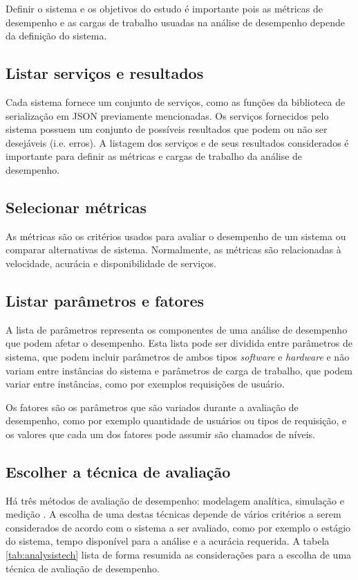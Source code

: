Definir o sistema e os objetivos do estudo é importante pois as métricas de desempenho e as cargas de trabalho usuadas na análise de desempenho depende da definição do sistema.

\subsection{Listar serviços e resultados}

Cada sistema fornece um conjunto de serviços, como as funções da biblioteca de serialização em JSON previamente mencionadas. Os serviços fornecidos pelo sistema possuem um conjunto de possíveis resultados que podem ou não ser desejáveis (i.e. erros). A listagem dos serviços e de seus resultados considerados é importante para definir as métricas e cargas de trabalho da análise de desempenho.

\subsection{Selecionar métricas}

As métricas são os critérios usados para avaliar o desempenho de um sistema ou comparar alternativas de sistema. Normalmente, as métricas são relacionadas à velocidade, acurácia e disponibilidade de serviços.

\subsection{Listar parâmetros e fatores}

A lista de parâmetros representa os componentes de uma análise de desempenho que podem afetar o desempenho. Esta lista pode ser dividida entre parâmetros de sistema, que podem incluir parâmetros de ambos tipos \textit{software} e \textit{hardware} e não variam entre instâncias do sistema e parâmetros de carga de trabalho, que podem variar entre instâncias, como por exemplos requisições de usuário.

Os fatores são os parâmetros que são variados durante a avaliação de desempenho, como por exemplo quantidade de usuários ou tipos de requisição, e os valores que cada um dos fatores pode assumir são chamados de níveis.

\subsection{Escolher a técnica de avaliação}

Há três métodos de avaliação de desempenho: modelagem analítica, simulação e medição \cite{jain1991art}. A escolha de uma destas técnicas depende de vários critérios a serem considerados de acordo com o sistema a ser avaliado, como por exemplo o estágio do sistema, tempo disponível para a análise e a acurácia requerida. A tabela \ref{tab:analysistech} lista de forma resumida as considerações para a escolha de uma técnica de avaliação de desempenho.

